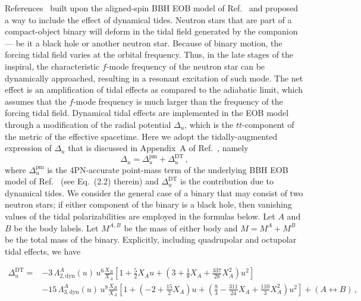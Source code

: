\documentclass[prd,aps,letter,twocolumn,floatfix,notitlepage]{revtex4-1}
\begin{document}
References~\cite{Hinderer:2016eia,Steinhoff:2016rfi} built upon the aligned-spin BBH EOB model of Ref.~\cite{Taracchini:2013rva} and proposed a way to include the effect of dynamical tides. Neutron stars that are part of a compact-object binary will deform in the tidal field generated by the companion --- be it a black hole or another neutron star. Because of binary motion, the forcing tidal field varies at the orbital frequency. Thus, in the late stages of the inspiral, the characteristic $f$-mode frequency of the neutron star can be dynamically approached, resulting in a resonant excitation of such mode. The net effect is an amplification of tidal effects as compared to the adiabatic limit, which assumes that the $f$-mode frequency is much larger than the frequency of the forcing tidal field. Dynamical tidal effects are implemented in the EOB model through a modification of the radial potential $\Delta_u$, which is the $tt$-component of the metric of the effective spacetime. Here we adopt the tidally-augmented expression of $\Delta_u$ that is discussed in Appendix~A of Ref.~\cite{Steinhoff:2016rfi}, namely
\begin{equation}
\Delta_u = \Delta_u^{\textrm{pm}} + \Delta_u^{\textrm{DT}}\,,
\end{equation}
where $\Delta_u^{\textrm{pm}}$ is the 4PN-accurate point-mass term of the underlying BBH EOB model of Ref.~\cite{Bohe:2016gbl} (see Eq.~(2.2) therein) and $\Delta_u^{\textrm{DT}}$ is the contribution due to dynamical tides. We consider the general case of a binary that may consist of two neutron stars; if either component of the binary is a black hole, then vanishing values of the tidal polarizabilities are employed in the formulas below. Let $A$ and $B$ be the body labels. Let $M^{A,B}$ be the mass of either body and $M=M^A+M^B$ be the total mass of the binary.  Explicitly, including quadrupolar and octupolar tidal effects, we have
\begin{widetext}
\begin{align}
 \Delta_u^{\textrm{DT}} =&  - 3\,\Lambda_{2,\textrm{dyn}}^{A}(u)\,u^6\frac{X_B}{X_A} \left[ 1 + \frac{5}{2} X_Au + \left(3 + \frac{1}{8}X_A + \frac{337}{28} X_A^2\right)u^2 \right]\nonumber\\
 &- 15\,\Lambda_{3,\textrm{dyn}}^{A}(u)\,u^8 \frac{X_B}{X_A}\left[1 + \left(-2 + \frac{15}{2}X_A\right)u + \left(\frac{8}{3} - \frac{311}{24}X_A + \frac{110}{3}X_A^2\right) u^2\right] + (A \leftrightarrow B)\,,
\end{align}
\end{widetext}
\end{document}
